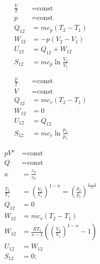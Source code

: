 \begin{boxleft}
\end{boxleft}\begin{boxrightshaded}
\begin{align*}
\frac{V}{T}&=\text{const}\\
p&=\text{const}\\
Q_{12}&=mc_p\left(T_2-T_1\right)\\
W_{12}&=-p\left(V_2-V_1\right)\\
U_{12}&=Q_{12}+ W_{12}\\
S_{12}&=mc_p\ln{\frac{V_2}{V_1}}
\end{align*}
\end{boxrightshaded}

\begin{boxleft}
\end{boxleft}\begin{boxrightshaded}
\begin{align*}
\frac{p}{T}&=\text{const}\\
V&=\text{const}\\
Q_{12}&=mc_v\left(T_2-T_1\right)\\
W_{12}&=0\\
U_{12}&=Q_{12}\\
S_{12}&=mc_v\ln{\frac{p_2}{p_1}}
\end{align*}
\end{boxrightshaded}



\begin{boxleft}
\end{boxleft}\begin{boxrightshaded}
\begin{align*}
pV^\kappa&=\text{const}\\
Q&=\text{const}\\
\kappa&=\frac{c_p}{c_V}\\
\frac{T_2}{T_1}&=\left(\frac{V_2}{V_1}\right)^{1-\kappa}=\left(\frac{p_2}{p_1}\right)^{\frac{\kappa-1}{\kappa}}\\
Q_{12}&=0\\
W_{12}&=mc_v\left(T_2-T_1\right)\\
W_{12}&=\frac{RT_1}{\kappa-1}\left(\left(\frac{V_2}{V_1}\right)^{1-\kappa}-1\right)\\
U_{12}&=W_{12}\\
S_{12}&=0;
\end{align*}
\end{boxrightshaded}


